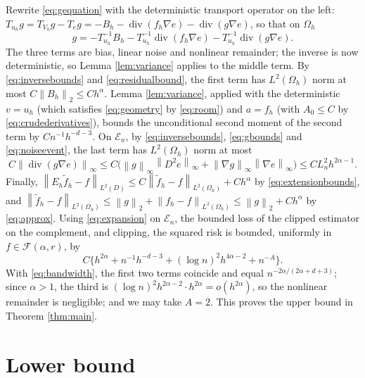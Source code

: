 \documentclass[12pt]{article}
\numberwithin{equation}{section}
\newcommand{\norm}[1]{\left\|#1\right\|}
\newcommand{\diver}{\operatorname{div}}
\begin{document}
Rewrite \eqref{eq:gequation} with the deterministic transport operator
on the left: $T_{u_h}g=T_{V_h}g-T_eg=-B_h-\diver(f_h\nabla e)
-\diver(g\nabla e)$, so that on $\Omega_h$
\begin{equation}\label{eq:expansion}
 g=-T_{u_h}^{-1}B_h
   -T_{u_h}^{-1}\diver(f_h\nabla e)
   -T_{u_h}^{-1}\diver(g\nabla e).
\end{equation}
The three terms are bias, linear noise and nonlinear remainder; the
inverse is now deterministic, so Lemma \ref{lem:variance} applies to
the middle term. By
\eqref{eq:inversebounds} and \eqref{eq:residualbound}, the first term
has $L^2(\Omega_h)$ norm at most $C\norm{B_h}_2\le Ch^\alpha$. Lemma
\ref{lem:variance}, applied with the deterministic $v=u_h$ (which
satisfies \eqref{eq:geometry} by \eqref{eq:room}) and $a=f_h$ (with
$A_0\le C$ by \eqref{eq:crudederivatives}), bounds the unconditional
second moment of the second term by $Cn^{-1}h^{-d-3}$. On
$\mathcal E_n$, by \eqref{eq:inversebounds}, \eqref{eq:gbounds} and
\eqref{eq:noiseevent}, the last term has $L^2(\Omega_h)$ norm at most
\begin{equation}\label{eq:remainder}
 C\norm{\diver(g\nabla e)}_\infty\le
 C\big(\norm g_\infty\norm{D^2e}_\infty
       +\norm{\nabla g}_\infty\norm{\nabla e}_\infty\big)
 \le CL_n^2h^{2\alpha-1}.
\end{equation}
Finally, $\norm{E_h\widetilde f_h-f}_{L^2(D)}\le
C\norm{\widetilde f_h-f}_{L^2(\Omega_h)}+Ch^\alpha$ by
\eqref{eq:extensionbounds}, and
$\norm{\widetilde f_h-f}_{L^2(\Omega_h)}\le\norm g_2+\norm{f_h-f}_{L^2(\Omega_h)}
\le\norm g_2+Ch^\alpha$ by \eqref{eq:approx}. Using
\eqref{eq:expansion} on $\mathcal E_n$, the bounded loss of the
clipped estimator on the complement, and clipping, the squared risk is
bounded, uniformly in $f\in\mathcal F(\alpha,r)$, by
\begin{equation}\label{eq:riskupper}
 C\{h^{2\alpha}+n^{-1}h^{-d-3}
           +(\log n)^2h^{4\alpha-2}+n^{-A}\}.
\end{equation}
With \eqref{eq:bandwidth}, the first two terms coincide and equal
$n^{-2\alpha/(2\alpha+d+3)}$; since $\alpha>1$, the third is
$(\log n)^2h^{2\alpha-2}\cdot h^{2\alpha}=o(h^{2\alpha})$, so the
nonlinear remainder is negligible; and we may take $A=2$. This proves
the upper bound in Theorem \ref{thm:main}.

\section{Lower bound}\label{sec:lower}
\end{document}
